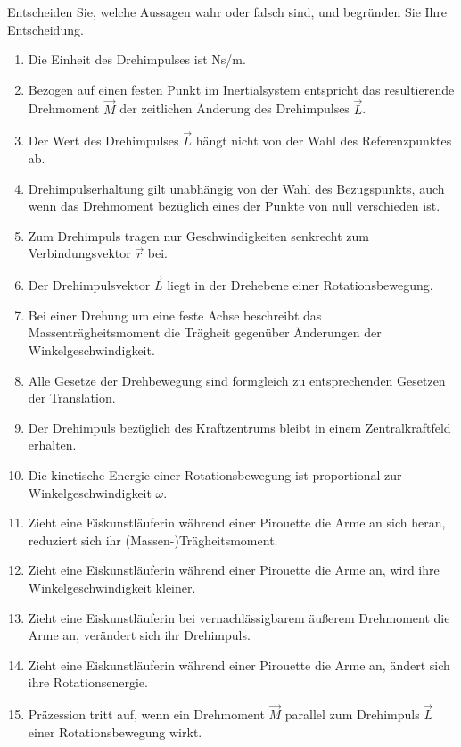\begin{ExerciseBlock}
Entscheiden Sie, welche Aussagen wahr oder falsch sind, und begründen Sie Ihre Entscheidung.
\begin{enumerate}
\item Die Einheit des Drehimpulses ist Ns/m.
\item Bezogen auf einen festen Punkt im Inertialsystem entspricht das resultierende Drehmoment $\vec M$ der zeitlichen Änderung des Drehimpulses $\vec L$.
\item Der Wert des Drehimpulses $\vec{L}$ hängt nicht von der Wahl des Referenzpunktes ab.
\item Drehimpulserhaltung gilt unabhängig von der Wahl des Bezugspunkts, auch wenn das Drehmoment bezüglich eines der Punkte von null verschieden ist.
\item Zum Drehimpuls tragen nur Geschwindigkeiten senkrecht zum Verbindungsvektor $\vec{r}$ bei.
\item Der Drehimpulsvektor $\vec{L}$ liegt in der Drehebene einer Rotationsbewegung.
\item Bei einer Drehung um eine feste Achse beschreibt das Massenträgheitsmoment die Trägheit gegenüber Änderungen der Winkelgeschwindigkeit.
\item Alle Gesetze der Drehbewegung sind formgleich zu entsprechenden Gesetzen der Translation.
\item Der Drehimpuls bezüglich des Kraftzentrums bleibt in einem Zentralkraftfeld erhalten.
\item Die kinetische Energie einer Rotationsbewegung ist proportional zur Winkelgeschwindigkeit $\omega$.
\item Zieht eine Eiskunstläuferin während einer Pirouette die Arme an sich heran, reduziert sich ihr (Massen-)Trägheitsmoment.
\item Zieht eine Eiskunstläuferin während einer Pirouette die Arme an, wird ihre Winkelgeschwindigkeit kleiner.
\item Zieht eine Eiskunstläuferin bei vernachlässigbarem äußerem Drehmoment die Arme an, verändert sich ihr Drehimpuls.
\item Zieht eine Eiskunstläuferin während einer Pirouette die Arme an, ändert sich ihre Rotationsenergie.
\item Präzession tritt auf, wenn ein Drehmoment $\vec{M}$ parallel zum Drehimpuls $\vec{L}$ einer Rotationsbewegung wirkt.
\end{enumerate}
\end{ExerciseBlock}

